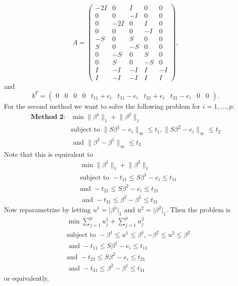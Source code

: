 \documentclass[12pt, leqno]{article}
\providecommand{\abs}[1]{\lvert#1\rvert}
\providecommand{\norm}[1]{\lVert#1\rVert}
\begin{document}
\[
A = \begin{pmatrix} 
-2I&0&I&0&0\\
0&0&-I&0&0\\
0&-2I&0&I&0\\
0&0&0&-I&0\\
-S&0&S&0&0\\
S&0&-S&0&0\\
0&-S&0&S&0\\
0&S&0&-S&0\\
I&-I&-I&I&-I\\
I&-I&-I&I&I
\end{pmatrix},
\]
and
\[
b^T = \begin{pmatrix}
  0&0&0&0&t_11+e_i&t_11-e_i&t_21+e_i&t_21-e_i&0&0 \end{pmatrix}.
\]
For the second method we want to solve the following problem for $i = 1,...,p$:
\begin{align*} \textbf{Method 2:}
&\min \norm{\beta^{1}}_1 + \norm{\beta^{2}}_1 \\
&\text{subject to } \norm{S\beta^{1} - e_i}_{\infty} \leq t_1 ,
  \norm{S\beta^{2} - e_i}_{\infty} \leq t_2 \\
&\text{ and } \norm{\beta^{2} - \beta^{1}}_{\infty} \leq t_3
\end{align*}
Note that this is equivalent to
\begin{align*}
&\min \norm{\beta^{1}}_1 + \norm{\beta^{2}}_1 \\
&\text{subject to } - t_11 \leq S\beta^{1} - e_i\leq t_11 \\
&\text{and }  -t_21 \leq S\beta^{2} - e_i \leq t_21 \\
&\text{ and } -t_31 \leq \beta^{2} - \beta^{1} \leq t_31
\end{align*}
Now reparametrize by letting $u^1 = \abs{\beta^{1}}_1$ and $u^2 =
\abs{\beta^{2}}_1$. Then the problem is 
\begin{align*}
&\min \sum_{j = 1}^p{u_j^1} +  \sum_{j = 1}^p{u_j^2} \\
&\text{subject to } -\beta^{1} \leq u^1 \leq \beta^{1},-\beta^{2} \leq
  u^2 \leq \beta^{2} \\
&\text{ and } - t_11 \leq S\beta^{1} - e_i\leq t_11 \\
&\text{and }  -t_21 \leq S\beta^{2} - e_i \leq t_21 \\
&\text{ and } -t_31 \leq \beta^{2} - \beta^{1} \leq t_31
\end{align*}
or equivalently,
\end{document}
